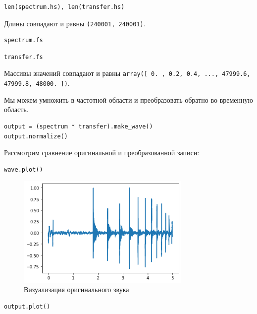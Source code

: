 \documentclass[a4paper,12pt]{report}
\begin{document}
\begin{lstlisting}[caption=Длина записей]
len(spectrum.hs), len(transfer.hs)
\end{lstlisting}

Длины совпадают и равны \texttt{(240001, 240001)}.

\begin{lstlisting}[caption=Длина первой записи]
spectrum.fs
\end{lstlisting}

\begin{lstlisting}[caption=Длина второй записи]
transfer.fs
\end{lstlisting}

Массивы значений совпадают и равны \texttt{array([    0. ,     0.2,     0.4, ..., 47999.6, 47999.8, 48000. ])}.

Мы можем умножить в частотной области и преобразовать обратно во временную область.

\begin{lstlisting}[caption=Перемножение]
output = (spectrum * transfer).make_wave()
output.normalize()
\end{lstlisting}

Рассмотрим сравнение оригинальной и преобразованной записи:

\begin{lstlisting}[caption=Визуализация оригинального звука]
wave.plot()
\end{lstlisting}

\begin{figure}[H]
        \centering
        \includegraphics[width=0.75\textwidth]{lab10_fig2_5.png}
        \caption{Визуализация оригинального звука}
        \label{fig:lab10_fig2_5}
\end{figure}

\begin{lstlisting}[caption=Визуализация преображённого звука]
output.plot()
\end{lstlisting}
\end{document}
